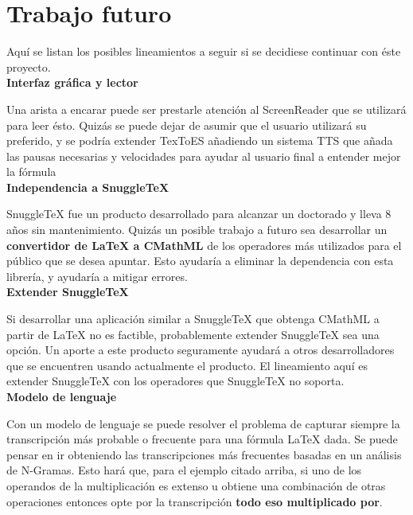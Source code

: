 \section{Trabajo futuro}

Aquí se listan los posibles lineamientos a seguir si se decidiese continuar con éste proyecto.\\

{\Large \textbf{Interfaz gráfica y lector}}

Una arista a encarar puede ser prestarle atención al ScreenReader que se utilizará para leer ésto. Quizás se puede dejar de asumir que el usuario utilizará su preferido, y se podría extender TexToES añadiendo un sistema TTS que añada las pausas necesarias y velocidades para ayudar al usuario final a entender mejor la fórmula\\

{\Large \textbf{Independencia a SnuggleTeX}}

SnuggleTeX fue un producto desarrollado para alcanzar un doctorado y lleva 8 años sin mantenimiento. Quizás un posible trabajo a futuro sea desarrollar un \textbf{convertidor de LaTeX a CMathML} de los operadores más utilizados para el público que se desea apuntar. Esto ayudaría a eliminar la dependencia con esta librería, y ayudaría a mitigar errores.\\

{\Large \textbf{Extender SnuggleTeX}}

Si desarrollar una aplicación similar a SnuggleTeX que obtenga CMathML a partir de LaTeX no es factible, probablemente extender SnuggleTeX sea una opción. Un aporte a este producto seguramente ayudará a otros desarrolladores que se encuentren usando actualmente el producto. El lineamiento aquí es extender SnuggleTeX con los operadores que SnuggleTeX no soporta.\\

{\Large\textbf{ Modelo de lenguaje}}

Con un modelo de lenguaje se puede resolver el problema de capturar siempre la transcripción más probable o frecuente para una fórmula LaTeX dada. Se puede pensar en ir obteniendo las transcripciones más frecuentes basadas en un análisis de N-Gramas. Esto hará que, para el ejemplo citado arriba, si uno de los operandos de la multiplicación es extenso u obtiene una combinación de otras operaciones entonces opte por la transcripción \textbf{todo eso multiplicado por}.